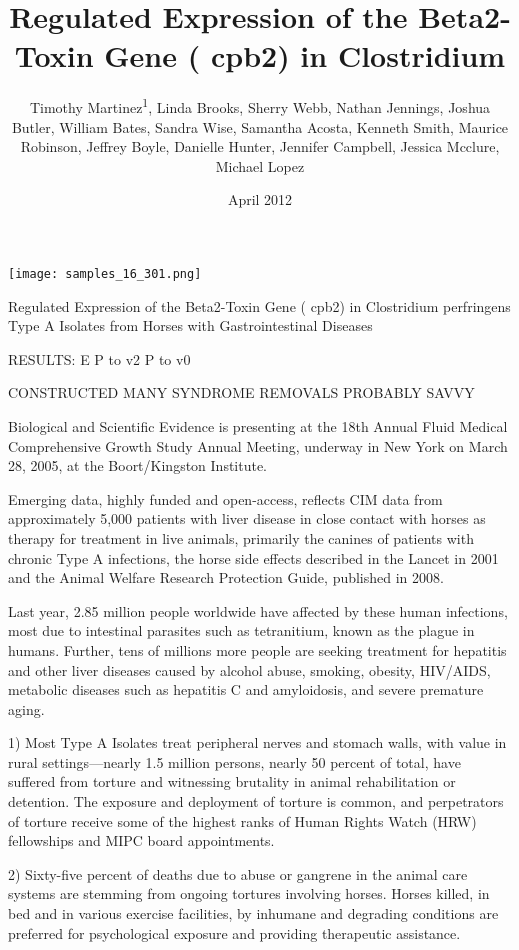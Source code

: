 \documentclass{article}
\title{Regulated Expression of the Beta2-Toxin Gene ( cpb2) in Clostridium}
\author{Timothy Martinez\textsuperscript{1},  Linda Brooks,  Sherry Webb,  Nathan Jennings,  Joshua Butler,  William Bates,  Sandra Wise,  Samantha Acosta,  Kenneth Smith,  Maurice Robinson,  Jeffrey Boyle,  Danielle Hunter,  Jennifer Campbell,  Jessica Mcclure,  Michael Lopez}
\affil{\textsuperscript{1}University of Tasmania}
\date{April 2012}
\begin{document}
\maketitle

\begin{center}
\begin{minipage}{0.75\linewidth}
\texttt{[image: samples\_16\_301.png]}
\end{minipage}
\end{center}

Regulated Expression of the Beta2-Toxin Gene ( cpb2) in Clostridium perfringens Type A Isolates from Horses with Gastrointestinal Diseases

RESULTS: E P to v2 P to v0

CONSTRUCTED MANY SYNDROME REMOVALS PROBABLY SAVVY

Biological and Scientific Evidence is presenting at the 18th Annual Fluid Medical Comprehensive Growth Study Annual Meeting, underway in New York on March 28, 2005, at the Boort/Kingston Institute.

Emerging data, highly funded and open-access, reflects CIM data from approximately 5,000 patients with liver disease in close contact with horses as therapy for treatment in live animals, primarily the canines of patients with chronic Type A infections, the horse side effects described in the Lancet in 2001 and the Animal Welfare Research Protection Guide, published in 2008.

Last year, 2.85 million people worldwide have affected by these human infections, most due to intestinal parasites such as tetranitium, known as the plague in humans. Further, tens of millions more people are seeking treatment for hepatitis and other liver diseases caused by alcohol abuse, smoking, obesity, HIV/AIDS, metabolic diseases such as hepatitis C and amyloidosis, and severe premature aging.

1) Most Type A Isolates treat peripheral nerves and stomach walls, with value in rural settings—nearly 1.5 million persons, nearly 50 percent of total, have suffered from torture and witnessing brutality in animal rehabilitation or detention. The exposure and deployment of torture is common, and perpetrators of torture receive some of the highest ranks of Human Rights Watch (HRW) fellowships and MIPC board appointments.

2) Sixty-five percent of deaths due to abuse or gangrene in the animal care systems are stemming from ongoing tortures involving horses. Horses killed, in bed and in various exercise facilities, by inhumane and degrading conditions are preferred for psychological exposure and providing therapeutic assistance.
\end{document}
